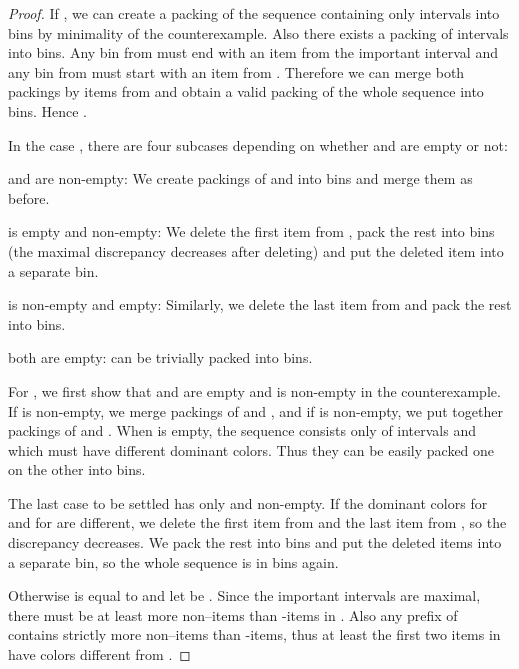 \documentclass[11pt,a4paper]{article}
\begin{document}
\begin{proof}
If , we can create a packing  of the sequence containing
only intervals  into  bins
by minimality of the counterexample.
Also there exists a packing  of intervals  into  bins.
Any bin from  must end with an item from the important interval  and any bin from  must start
with an item from . Therefore we can merge both packings by items
from  and obtain a valid packing of the whole sequence into 
bins. Hence .

In the case , there are four subcases depending on whether  and  are empty or not:
\begin{compactitem}
\item  and  are non-empty: We create packings of  and  into  bins
  and merge them as before.
\item  is empty and  non-empty: We delete the first item from , pack the rest into  bins
  (the maximal discrepancy decreases after deleting) and put the deleted item into a separate bin.
\item  is non-empty and  empty: Similarly, we delete the last item from  and pack the rest into  bins.
\item both are empty:  can be trivially packed into  bins.
\end{compactitem}

For , we first show that  and  are empty and  is non-empty in the counterexample.
If  is non-empty, we merge packings of  and ,
and if  is non-empty, we put together packings of  and .
When  is empty, the sequence consists only of intervals  and  which must have different
dominant colors. Thus they can be easily packed one on the other into  bins.

The last case to be settled has only  and  non-empty. If the dominant colors  for 
and  for  are different, we delete the first item from 
and the last item from , so the discrepancy decreases.
We pack the rest into  bins and put the deleted items into a
separate bin, so the whole sequence is in  bins again.

Otherwise  is equal to  and let  be . Since the important intervals are maximal, there must
be at least  more non--items than -items in .
Also any prefix of  contains strictly more non--items than -items,
thus at least the first two items in  have colors different from .


\end{proof}
\end{document}
